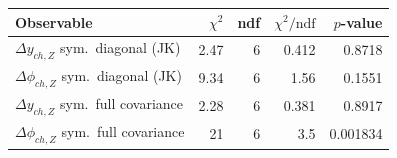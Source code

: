 \begin{tabular}{|l|r|r|r|r|}
\hline
Observable & $\chi^2$ & ndf & $\chi^2/\mathrm{ndf}$ & $p$-value \\
\hline
$\Delta y_{ch,Z}$ sym.\ diagonal (JK) & 2.47 & 6 & 0.412 & 0.8718 \\
$\Delta\phi_{ch,Z}$ sym.\ diagonal (JK) & 9.34 & 6 & 1.56 & 0.1551 \\
$\Delta y_{ch,Z}$ sym.\ full covariance & 2.28 & 6 & 0.381 & 0.8917 \\
$\Delta\phi_{ch,Z}$ sym.\ full covariance & 21 & 6 & 3.5 & 0.001834 \\
\hline
\end{tabular}
